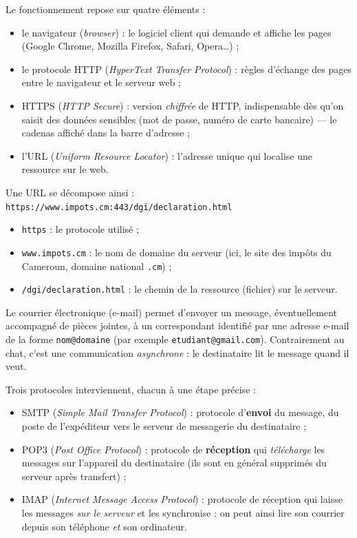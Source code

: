 \documentclass[11pt]{article}
\newcommand{\cle}[1]{{\popxbold\color{popdark}#1}}
\newcounter{popsec}
\newcounter{popsub}
\newcommand{\courssub}[1]{%
  \stepcounter{popsub}%
  \par\vspace{9pt}\noindent{\popxbold\fontsize{11.5}{13}\selectfont\color{popink}{\color{poporange}\thepopsec.\thepopsub}\hspace{6pt}#1}\par\nopagebreak\vspace{4pt}
}
\begin{document}
Le fonctionnement repose sur quatre éléments :
\begin{itemize}
  \item le \cle{navigateur} (\emph{browser}) : le logiciel client qui demande et affiche les pages (Google Chrome, Mozilla Firefox, Safari, Opera\ldots) ;
  \item le protocole \cle{HTTP} (\emph{HyperText Transfer Protocol}) : règles d'échange des pages entre le navigateur et le serveur web ;
  \item \cle{HTTPS} (\emph{HTTP Secure}) : version \emph{chiffrée} de HTTP, indispensable dès qu'on saisit des données sensibles (mot de passe, numéro de carte bancaire) — le cadenas affiché dans la barre d'adresse ;
  \item l'\cle{URL} (\emph{Uniform Resource Locator}) : l'adresse unique qui localise une ressource sur le web.
\end{itemize}

\begin{propriete}
Une URL se décompose ainsi : \texttt{https://www.impots.cm:443/dgi/declaration.html}
\begin{itemize}
  \item \texttt{https} : le protocole utilisé ;
  \item \texttt{www.impots.cm} : le nom de domaine du serveur (ici, le site des impôts du Cameroun, domaine national \texttt{.cm}) ;
  \item \texttt{/dgi/declaration.html} : le chemin de la ressource (fichier) sur le serveur.
\end{itemize}
\end{propriete}

\courssub{Le courrier électronique (e-mail)}

Le \cle{courrier électronique} (e-mail) permet d'envoyer un message, éventuellement accompagné de pièces jointes, à un correspondant identifié par une \cle{adresse e-mail} de la forme \texttt{nom@domaine} (par exemple \texttt{etudiant@gmail.com}). Contrairement au chat, c'est une communication \emph{asynchrone} : le destinataire lit le message quand il veut.

Trois protocoles interviennent, chacun à une étape précise :
\begin{itemize}
  \item \cle{SMTP} (\emph{Simple Mail Transfer Protocol}) : protocole d'\textbf{envoi} du message, du poste de l'expéditeur vers le serveur de messagerie du destinataire ;
  \item \cle{POP3} (\emph{Post Office Protocol}) : protocole de \textbf{réception} qui \emph{télécharge} les messages sur l'appareil du destinataire (ils sont en général supprimés du serveur après transfert) ;
  \item \cle{IMAP} (\emph{Internet Message Access Protocol}) : protocole de réception qui laisse les messages \emph{sur le serveur} et les synchronise : on peut ainsi lire son courrier depuis son téléphone \emph{et} son ordinateur.
\end{itemize}
\end{document}
